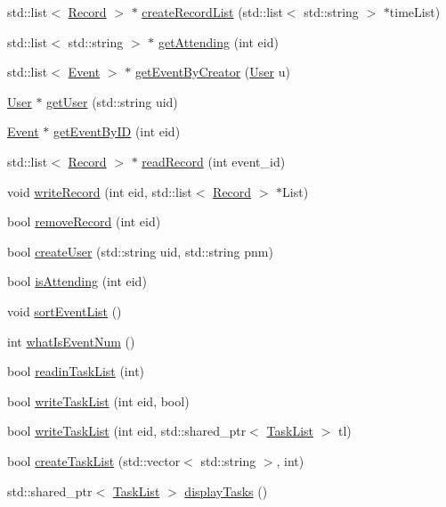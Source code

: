\begin{DoxyCompactItemize}
std\+::list$<$ \mbox{\hyperlink{class_record}{Record}} $>$ $\ast$ \mbox{\hyperlink{class_executive_a513c12461670a2a2c6b5f69a387fa43c}{create\+Record\+List}} (std\+::list$<$ std\+::string $>$ $\ast$time\+List)
\item 
std\+::list$<$ std\+::string $>$ $\ast$ \mbox{\hyperlink{class_executive_a68f603b8cdd1bc53a2e0565677f71f4e}{get\+Attending}} (int eid)
\item 
std\+::list$<$ \mbox{\hyperlink{class_event}{Event}} $>$ $\ast$ \mbox{\hyperlink{class_executive_a227a53f3d58c360c1248c9ccc3a47f58}{get\+Event\+By\+Creator}} (\mbox{\hyperlink{class_user}{User}} u)
\item 
\mbox{\hyperlink{class_user}{User}} $\ast$ \mbox{\hyperlink{class_executive_adbf182bb09881e5a7ab01689fd653afd}{get\+User}} (std\+::string uid)
\item 
\mbox{\hyperlink{class_event}{Event}} $\ast$ \mbox{\hyperlink{class_executive_a13bb89f1f430e27fe3b99d1ef10bf07b}{get\+Event\+By\+ID}} (int eid)
\item 
std\+::list$<$ \mbox{\hyperlink{class_record}{Record}} $>$ $\ast$ \mbox{\hyperlink{class_executive_aa0ae7cbbd2aac0b953cdae30d8692f35}{read\+Record}} (int event\+\_\+id)
\item 
void \mbox{\hyperlink{class_executive_a32e7d63d1978cef1db5bd55f085aa137}{write\+Record}} (int eid, std\+::list$<$ \mbox{\hyperlink{class_record}{Record}} $>$ $\ast$List)
\item 
bool \mbox{\hyperlink{class_executive_a3f464b27db4195c975283ce20cf3c3f9}{remove\+Record}} (int eid)
\item 
bool \mbox{\hyperlink{class_executive_aaf4e73a2e3e6515a1e15569d50ed7017}{create\+User}} (std\+::string uid, std\+::string pnm)
\item 
bool \mbox{\hyperlink{class_executive_a65588e97784c7062ba999b141b683bd0}{is\+Attending}} (int eid)
\item 
void \mbox{\hyperlink{class_executive_a63e7fcccc1e3992eaef93630ecc2a160}{sort\+Event\+List}} ()
\item 
int \mbox{\hyperlink{class_executive_a1e769171afd89ec03795717057642d5a}{what\+Is\+Event\+Num}} ()
\item 
bool \mbox{\hyperlink{class_executive_a13d8530957ee3c54bb355b62005177ed}{readin\+Task\+List}} (int)
\item 
bool \mbox{\hyperlink{class_executive_aa717a460eec1cdfe11808611dd8aeb8e}{write\+Task\+List}} (int eid, bool)
\item 
bool \mbox{\hyperlink{class_executive_ae4225a37c7c9f8299c59eb1cc07d221a}{write\+Task\+List}} (int eid, std\+::shared\+\_\+ptr$<$ \mbox{\hyperlink{class_task_list}{Task\+List}} $>$ tl)
\item 
bool \mbox{\hyperlink{class_executive_a67738864000986968126007b8cbdbb71}{create\+Task\+List}} (std\+::vector$<$ std\+::string $>$, int)
\item 
std\+::shared\+\_\+ptr$<$ \mbox{\hyperlink{class_task_list}{Task\+List}} $>$ \mbox{\hyperlink{class_executive_aa2116b9668aa8fbae3be98ab35258db5}{display\+Tasks}} ()
\end{DoxyCompactItemize}

